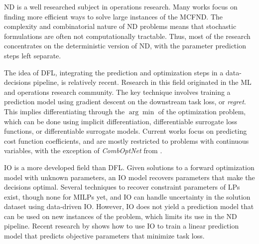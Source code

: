 ND is a well researched subject in operations research. Many works focus on finding more efficient ways to solve large instances of the MCFND. The complexity and combinatorial nature of ND problems means that stochastic formulations are often not computationally tractable. Thus, most of the research concentrates on the deterministic version of ND, with the parameter prediction steps left separate. 

The idea of DFL, integrating the prediction and optimization steps in a data-decisions pipeline, is relatively recent. Research in this field originated in the ML and operations research community. The key technique involves training a prediction model using gradient descent on the downstream task loss, or \textit{regret}. This implies differentiating through the $\arg\min$ of the optimization problem, which can be done using implicit differentiation, differentiable surrogate loss functions, or differentiable surrogate models. Current works focus on predicting cost function coefficients, and are mostly restricted to problems with continuous variables, with the exception of \textit{CombOptNet} from \cite{paulusCombOptNetFitRight2022}.

IO is a more developed field than DFL. Given solutions to a forward optimization model with unknown parameters, an IO model recovers parameters that make the decisions optimal. Several techniques to recover constraint parameters of LPs exist, though none for MILPs yet, and IO can handle uncertainty in the solution dataset using data-driven IO. However, IO does not yield a prediction model that can be used on new instances of the problem, which limits its use in the ND pipeline. Recent research by \cite{sunMaximumOptimalityMargin2023} shows how to use IO to train a linear prediction model that predicts objective parameters that minimize task loss.

